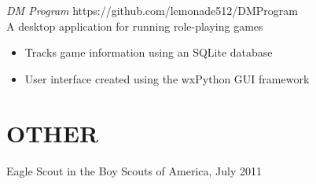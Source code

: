 \documentclass[margin,11pt]{res}
\begin{document}
\begin{resume}
    {\sl DM Program} \hfill https://github.com/lemonade512/DMProgram\\
    A desktop application for running role-playing games
    \begin{itemize} \itemsep -2pt
        \item Tracks game information using an SQLite database
        \item User interface created using the wxPython GUI framework
    \end{itemize}

\section{OTHER}
    Eagle Scout in the Boy Scouts of America, July 2011 \\


\end{resume}
\end{document}
